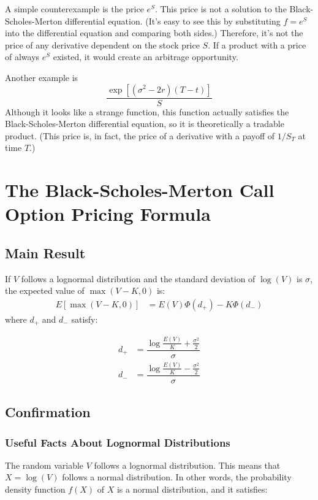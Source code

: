\documentclass[uplatex]{jsarticle}
\begin{document}
A simple counterexample is the price $e^{S}$. This price is not a solution to the Black-Scholes-Merton differential equation. (It's easy to see this by substituting $f = e^{S}$ into the differential equation and comparing both sides.) Therefore, it's not the price of any derivative dependent on the stock price $S$. If a product with a price of always $e^{S}$ existed, it would create an arbitrage opportunity.

Another example is
$$
	\dfrac{\exp{[(\sigma^{2} - 2r)(T-t)]}}{S}
$$
Although it looks like a strange function, this function actually satisfies the Black-Scholes-Merton differential equation, so it is theoretically a tradable product. (This price is, in fact, the price of a derivative with a payoff of $1/S_{T}$ at time $T$.)

\section{The Black-Scholes-Merton Call Option Pricing Formula}

\subsection{Main Result}

If $V$ follows a lognormal distribution and the standard deviation of $\log(V)$ is $\sigma$, the expected value of $\max(V-K,0)$ is:
\begin{align}
	E \left[ \max(V-K,0) \right] & = E(V) \Phi (d_{+}) - K \Phi (d_{-})
\end{align}
where $d_{+}$ and $d_{-}$ satisfy:

\begin{align}
	d_{+} & = \dfrac{ \log \frac{E(V)}{K} + \frac{\sigma^{2}}{2} }{ \sigma } \\
	d_{-} & = \dfrac{ \log \frac{E(V)}{K} - \frac{\sigma^{2}}{2} }{ \sigma }
\end{align}

\subsection{Confirmation}

\subsubsection{Useful Facts About Lognormal Distributions}

The random variable $V$ follows a lognormal distribution. This means that $X = \log(V)$ follows a normal distribution. In other words, the probability density function $f(X)$ of $X$ is a normal distribution, and it satisfies:
\end{document}
